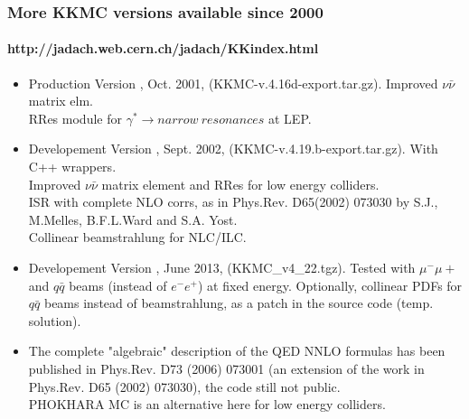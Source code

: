 \documentclass{beamer}
\newcommand{\cbl}{\color{blue}}
\newcommand{\cmg}{\color{magenta}}
\begin{document}
\begin{frame}[fragile]
\frametitle{\bf More KKMC versions available since 2000}
\framesubtitle{http://jadach.web.cern.ch/jadach/KKindex.html}
\small
\begin{itemize}
\item
Production Version \fbox{\cmg 4.16}, Oct. 2001,  
(KKMC-v.4.16d-export.tar.gz).
{\cbl Improved $\nu\bar{\nu}$ matrix elm.}\\
RRes module for $\gamma^* \to narrow~resonances$ at LEP.
\item
Developement Version \fbox{\cmg 4.19}, Sept. 2002,  
(KKMC-v.4.19.b-export.tar.gz). {\cbl With C++ wrappers.}\\
Improved $\nu\bar{\nu}$ matrix element and RRes for low energy colliders.\\
ISR with complete NLO corrs,
as in Phys.Rev. D65(2002) 073030 by S.J., M.Melles, B.F.L.Ward and S.A. Yost.\\
{\cbl Collinear beamstrahlung} for NLC/ILC.
\item
Developement Version \fbox{\cmg 4.22}, June 2013,  
(KKMC\_v4\_22.tgz).
Tested with {\cbl $\mu^-\mu+$ and $q\bar{q}$ beams}
(instead of $e^-e^+$) at fixed energy.
Optionally, collinear PDFs for $q\bar{q}$ beams instead of beamstrahlung,
as a patch in the source code (temp. solution).
\item
{\footnotesize
The complete "algebraic" description of the {\cbl QED NNLO} formulas has been
published in Phys.Rev. D73 (2006) 073001
(an extension of the work in Phys.Rev. D65 (2002) 073030),
the code still not public.\\
PHOKHARA MC is an alternative here for low energy colliders.}
\end{itemize}

\end{frame}
\end{document}
